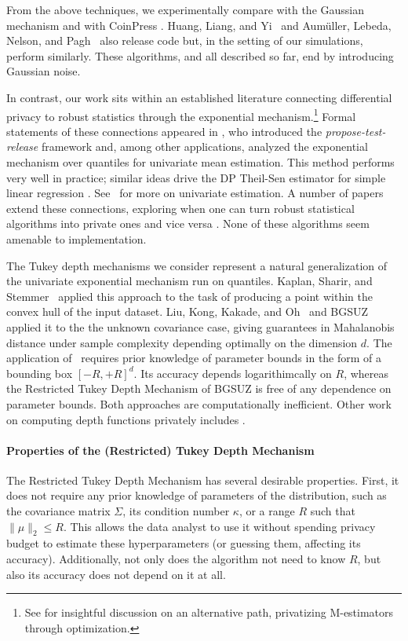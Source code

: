 From the above techniques, we experimentally compare with the Gaussian mechanism and with CoinPress \cite{biswas2020coinpress}. 
Huang, Liang, and Yi~\cite{HuangLY21} and Aum{\"u}ller, Lebeda, Nelson, and Pagh~\cite{aumuller2023plan} also release code but, in the setting of our simulations, perform similarly. 
These algorithms, and all described so far, end by introducing Gaussian noise. 

In contrast, our work sits within an established literature connecting differential privacy to robust statistics through the exponential mechanism.\footnote{See  \cite{avella2023differentially,yu2024gaussian} for insightful discussion on an alternative path, privatizing M-estimators through optimization.}
Formal statements of these connections appeared in \cite{DworkL09}, who introduced the \emph{propose-test-release} framework and, among other applications, analyzed the exponential mechanism over quantiles for univariate mean estimation.
This method performs very well in practice; similar ideas drive the DP Theil-Sen estimator for simple linear regression \cite{alabi2020differentially,sarathy2022analyzing}.
See~ for more on univariate estimation.
A number of papers extend these connections, exploring when one can turn robust statistical algorithms into private ones and vice versa \cite{asi2020instance, liu2022differential,georgiev2022induces,hopkins2023robustness,alabi2022privately,asi2023robustness}. 
None of these algorithms seem amenable to implementation.

The Tukey depth mechanisms we consider represent a natural generalization of the univariate exponential mechanism run on quantiles.
Kaplan, Sharir, and Stemmer~\cite{kaplan2020find} applied this approach to the task of producing a point within the convex hull of the input dataset.
Liu, Kong, Kakade, and Oh~\cite{liu2021robust} and BGSUZ applied it to the the unknown covariance case, giving guarantees in Mahalanobis distance under sample complexity depending optimally on the dimension $d$. 
The application of~\cite{liu2021robust} requires prior knowledge of parameter bounds in the form of a bounding box $[-R,+R]^d$.
Its accuracy depends logarithimcally on $R$, whereas the Restricted Tukey Depth Mechanism of BGSUZ is free of any dependence on parameter bounds. 
Both approaches are computationally inefficient. 
Other work on computing depth functions privately includes \cite{ramsay2021differentially,cumings2022differentially,ramsay2023differentially}. 

\paragraph{Properties of the (Restricted) Tukey Depth Mechanism} The Restricted Tukey Depth Mechanism has several desirable properties.
First, it does not require any prior knowledge of parameters of the distribution, such as the covariance matrix $\Sigma$, its condition number $\kappa$, or a range $R$ such that $\|\mu\|_2\leq R$. 
This allows the data analyst to use it without spending privacy budget to estimate these hyperparameters (or guessing them, affecting its accuracy). 
Additionally, not only does the algorithm not need to know $R$, but also its accuracy does not depend on it at all.


